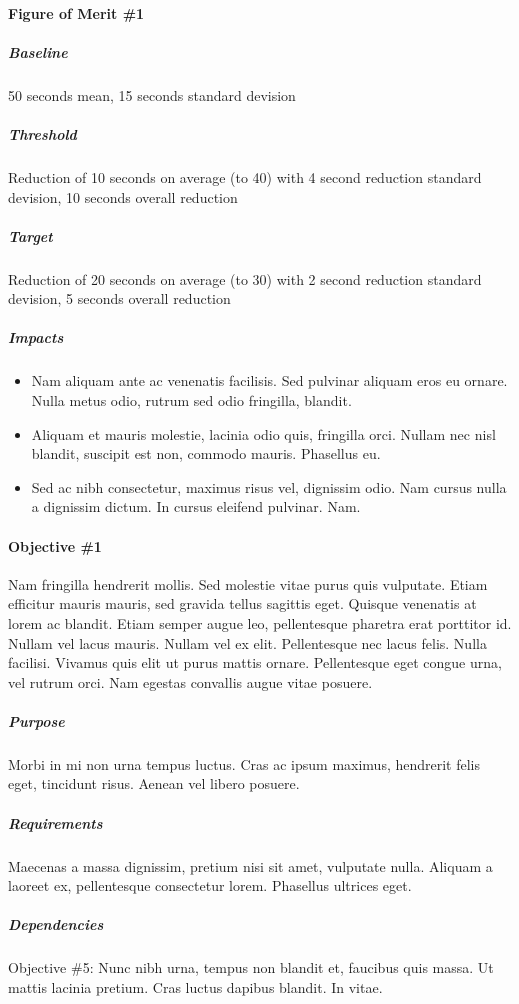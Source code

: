 		\paragraph{Figure of Merit \#1}

			\subparagraph{Baseline} 50 seconds mean, 15 seconds standard devision

			\subparagraph{Threshold} Reduction of 10 seconds on average (to 40) with 4 second reduction standard devision, 10 seconds overall reduction 

			\subparagraph{Target} Reduction of 20 seconds on average (to 30) with 2 second reduction standard devision, 5 seconds overall reduction 

			\subparagraph{Impacts} 
				\begin{itemize}
					\item Nam aliquam ante ac venenatis facilisis. Sed pulvinar aliquam eros eu ornare. Nulla metus odio, rutrum sed odio fringilla, blandit.
					\item Aliquam et mauris molestie, lacinia odio quis, fringilla orci. Nullam nec nisl blandit, suscipit est non, commodo mauris. Phasellus eu.
					\item Sed ac nibh consectetur, maximus risus vel, dignissim odio. Nam cursus nulla a dignissim dictum. In cursus eleifend pulvinar. Nam.
				\end{itemize}

		\paragraph{Objective \#1}
		Nam fringilla hendrerit mollis. Sed molestie vitae purus quis vulputate. Etiam efficitur mauris mauris, sed gravida tellus sagittis eget. Quisque venenatis at lorem ac blandit. Etiam semper augue leo, pellentesque pharetra erat porttitor id. Nullam vel lacus mauris. Nullam vel ex elit. Pellentesque nec lacus felis. Nulla facilisi. Vivamus quis elit ut purus mattis ornare. Pellentesque eget congue urna, vel rutrum orci. Nam egestas convallis augue vitae posuere.

			\subparagraph{Purpose} Morbi in mi non urna tempus luctus. Cras ac ipsum maximus, hendrerit felis eget, tincidunt risus. Aenean vel libero posuere.

			\subparagraph{Requirements} Maecenas a massa dignissim, pretium nisi sit amet, vulputate nulla. Aliquam a laoreet ex, pellentesque consectetur lorem. Phasellus ultrices eget.

			\subparagraph{Dependencies} Objective \#5: Nunc nibh urna, tempus non blandit et, faucibus quis massa. Ut mattis lacinia pretium. Cras luctus dapibus blandit. In vitae.

